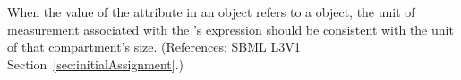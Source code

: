 When the value of the attribute  in an \InitialAssignment
object refers to a \Compartment object, the unit of measurement associated
with the \InitialAssignment's  expression should be consistent
with the unit of that compartment's size.  (References: SBML L3V1
Section~\ref{sec:initialAssignment}.)
